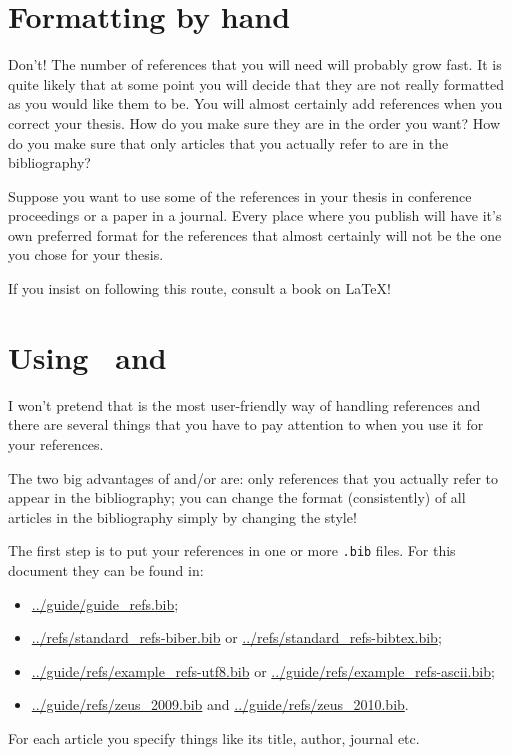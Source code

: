 \section{Formatting by hand}%
\label{sec:ref:bibitem}

Don't! The number of references that you will need will probably grow
fast. It is quite likely that at some point you will decide that they
are not really formatted as you would like them to be. You will almost
certainly add references when you correct your thesis. How do you
make sure they are in the order you want? How do you make sure that
only articles that you actually refer to are in the bibliography?

Suppose you want to use some of the references in your thesis in
conference proceedings or a paper in a journal. Every place where you
publish will have it's own preferred format for the references that
almost certainly will not be the one you chose for your thesis.

If you insist on following this route, consult a book on \LaTeX{}!


\section{Using \BibTeX\ and }%
\label{sec:ref:bibtex}

I won't pretend that \BibTeX{} is the most user-friendly way of
handling references and there are several things that you have to pay
attention to when you use it for your references.

The two big advantages of  and/or \BibTeX{} are: only references that you
actually refer to appear in the bibliography; you can change the
format (consistently) of all articles in the bibliography simply by
changing the style!

The first step is to put your references in one or more \texttt{.bib}
files. For this document they can be found in:
\begin{itemize}
\setlength{\itemsep}{0pt}
\item \url{../guide/guide_refs.bib};
\item \url{../refs/standard_refs-biber.bib} or
  \url{../refs/standard_refs-bibtex.bib};
\item \url{../guide/refs/example_refs-utf8.bib} or
  \url{../guide/refs/example_refs-ascii.bib};
\item \url{../guide/refs/zeus_2009.bib} and
  \url{../guide/refs/zeus_2010.bib}.
\end{itemize}
For each article you specify things like its
title, author, journal etc.

